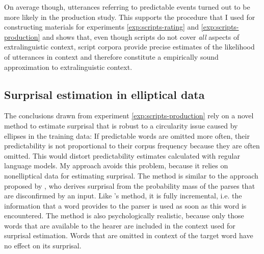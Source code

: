On average though, utterances referring to predictable events turned out to be more likely in the production study. This supports the procedure that I used for constructing materials for experiments \ref{exp:scripts-rating} and \ref{exp:scripts-production} and shows that, even though scripts do not cover \textit{all} aspects of extralinguistic context, script corpora provide precise estimates of the likelihood of utterances in context and therefore constitute a empirically sound approximation to extralinguistic context.

\newpage
\subsection{Surprisal estimation in elliptical data}

The conclusions drawn from experiment \ref{exp:scripts-production} rely on a novel method to estimate surprisal that is robust to a circularity issue caused by ellipses in the training data: If predictable words are omitted more often, their predictability is not proportional to their corpus frequency because they are often omitted. This would distort predictability estimates calculated with regular language models. My approach avoids this problem, because it relies on nonelliptical data for estimating surprisal. The method is similar to the approach proposed by \citet{hale2001}, who derives surprisal from the probability mass of the parses that are disconfirmed by an input. Like \citeauthor{hale2001}'s method, it is fully incremental, i.e. the information that a word provides to the parser is used as soon as this word is encountered. The method is also psychologically realistic, because only those words that are available to the hearer are included in the context used for surprisal estimation. Words that are omitted in context of the target word have no effect on its surprisal.

